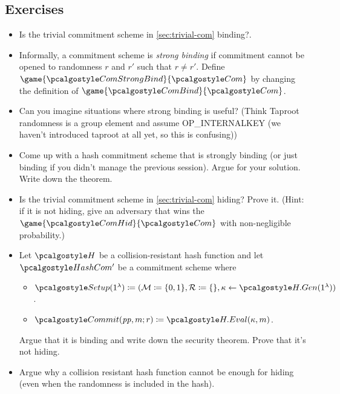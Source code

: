 \subsection{Exercises}
\begin{itemize}
  \item Is the trivial commitment scheme in \cref{sec:trivial-com} binding?.
  \item Informally, a commitment scheme is \emph{strong binding} if commitment cannot be opened to randomness $r$ and $r'$ such that $r \neq r'$. 
        Define $\game{\algo{ComStrongBind}}{\algo{Com}}$ by changing the definition of $\game{\algo{ComBind}}{\algo{Com}}$.
  \item Can you imagine situations where strong binding is useful? (Think Taproot randomness is a group element and assume OP\_INTERNALKEY (we haven't introduced taproot at all yet, so this is confusing))
  \item Come up with a hash commitment scheme that is strongly binding (or just binding if you didn't manage the previous session). Argue for your solution. Write down the theorem.
  \item Is the trivial commitment scheme in \cref{sec:trivial-com} hiding?
        Prove it.
        (Hint: if it is not hiding, give an adversary that wins the $\game{\algo{ComHid}}{\algo{Com}}$ with non-negligible probability.)
  \item Let $\algo{H}$ be a collision-resistant hash function and let $\algo{HashCom'}$ be a commitment scheme where
    \begin{itemize}
      \item $\algo{Setup}(1^\lambda) \defeq (\mathcal{M} \defeq \{0, 1\}, \mathcal{R} \defeq \{\}, \kappa \gets \algo{H.Gen}(1^\lambda))$.
      \item $\algo{Commit}(\params,m;r) \defeq  \algo{H.Eval}(\kappa, m)$.
    \end{itemize}
    Argue that it is binding and write down the security theorem.
    Prove that it's not hiding.
  \item Argue why a collision resistant hash function cannot be enough for hiding (even when the randomness is included in the hash).
\end{itemize}